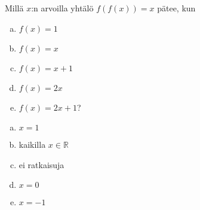 \begin{tehtava}
Millä $x$:n arvoilla yhtälö $f(f(x)) = x$ pätee, kun
\begin{enumerate}[a)]
\item $f(x) = 1$
\item $f(x) = x$
\item $f(x) = x+1$
\item $f(x) = 2x$
\item $f(x) = 2x+1$?
\end{enumerate}

\begin{vastaus}
\begin{enumerate}[a)]
\item $x = 1$
\item kaikilla $x\in\mathbb{R}$
\item ei ratkaisuja
\item $x = 0$
\item $x = -1$
\end{enumerate}
\end{vastaus}
\end{tehtava}
